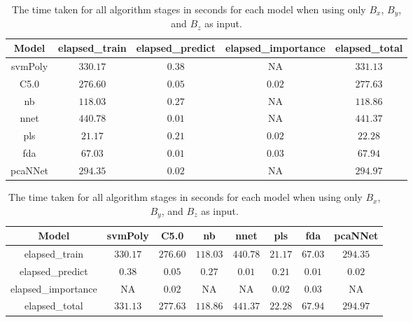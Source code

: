 \begin{table}[!ht]
	\centering
	\begin{tabular}{|c|c|c|c|c|}
		\hline
		Model & elapsed_train & elapsed_predict & elapsed_importance & elapsed_total \\ \hline
		svmPoly & $330.17$ & $0.38$ & NA & $331.13$ \\ \hline
		C5.0 & $276.60$ & $0.05$ & $0.02$ & $277.63$ \\ \hline
		nb & $118.03$ & $0.27$ & NA & $118.86$ \\ \hline
		nnet & $440.78$ & $0.01$ & NA & $441.37$ \\ \hline
		pls & $21.17$ & $0.21$ & $0.02$ & $22.28$ \\ \hline
		fda & $67.03$ & $0.01$ & $0.03$ & $67.94$ \\ \hline
		pcaNNet & $294.35$ & $0.02$ & NA & $294.97$ \\ \hline
	\end{tabular}
	\caption{The time taken for all algorithm stages in seconds for each model when using only $B_{x}$, $B_{y}$, and $B_{z}$ as input.}
	\label{tab:time:coord}
\end{table}

\begin{table}[!ht]
	\centering
	\begin{tabular}{|c|c|c|c|c|c|c|c|}
		\hline
		Model & svmPoly & C5.0 & nb & nnet & pls & fda & pcaNNet \\ \hline
		elapsed_train & $330.17$ & $276.60$ & $118.03$ & $440.78$ & $21.17$ & $67.03$ & $294.35$ \\ \hline
		elapsed_predict & $0.38$ & $0.05$ & $0.27$ & $0.01$ & $0.21$ & $0.01$ & $0.02$ \\ \hline
		elapsed_importance & NA & $0.02$ & NA & NA & $0.02$ & $0.03$ & NA \\ \hline
		elapsed_total & $331.13$ & $277.63$ & $118.86$ & $441.37$ & $22.28$ & $67.94$ & $294.97$ \\ \hline
	\end{tabular}
	\caption{The time taken for all algorithm stages in seconds for each model when using only $B_{x}$, $B_{y}$, and $B_{z}$ as input.}
	\label{tab:time:reverse:coord}
\end{table}

